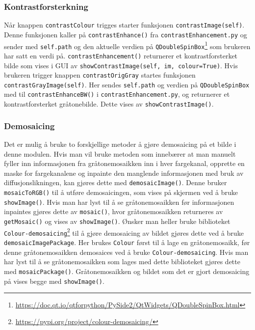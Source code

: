 \subsubsection{Kontrastforsterkning}
Når knappen \texttt{contrastColour} trigges starter funksjonen \texttt{contrastImage(self)}. Denne funksjonen kaller på \texttt{contrastEnhance()} fra \texttt{contrastEnhancement.py} og sender med \texttt{self.path} og den aktuelle verdien på \texttt{QDoubleSpinBox}\footnote{\url{https://doc.qt.io/qtforpython/PySide2/QtWidgets/QDoubleSpinBox.html}} som brukeren har satt en verdi på. \texttt{contrastEnhancement()} returnerer et kontrastforsterket bilde som vises i GUI av \texttt{showContrastImage(self, im, colour=True)}. Hvis brukeren trigger knappen \texttt{contrastOrigGray} startes funksjonen \texttt{contrastGrayImage(self)}. Her sendes \texttt{self.path} og verdien på \texttt{QDoubleSpinBox} med til \texttt{contrastEnhanceBW()} i 
\texttt{contrastEnhancement.py}, og returnerer et kontrastforsterket gråtonebilde. Dette vises av \texttt{showContrastImage()}.

\subsubsection{Demosaicing}
Det er mulig å bruke to forskjellige metoder å gjøre demosaicing på et bilde i denne modulen. Hvis man vil bruke metoden som innebærer at man manuelt fyller inn informasjonen fra gråtonemosaikken inn i hver fargekanal, opprette en maske for fargekanalene og inpainte den manglende informasjonen med bruk av diffusjonslikningen, kan gjøres dette med \texttt{demosaicImage()}. Denne bruker \texttt{mosaicToRGB()} til å utføre demosaicingen, som vises på skjermen ved å bruke \texttt{showImage()}. Hvis man har lyst til å se gråtonemosaikken før informasjonen inpaintes gjøres dette av \texttt{mosaic()}, hvor gråtonemosaikken returneres av \texttt{getMosaic()} og vises av \texttt{showImage()}. Ønsker man heller bruke biblioteket \texttt{Colour-demosaicing}\footnote{\url{https://pypi.org/project/colour-demosaicing/}} til å gjøre demosaicing av bildet gjøres dette ved å bruke \texttt{demosaicImagePackage}. Her brukes \texttt{Colour} først til å lage en gråtonemosaikk, før denne gråtonemosaikken demosaices ved å bruke \texttt{Colour-demosaicing}. Hvis man har lyst til å se gråtonemosaikken som lages med dette biblioteket gjøres dette med \texttt{mosaicPackage()}. Gråtonemosaikken og bildet som det er gjort demosaicing på vises begge med \texttt{showImage()}. 

